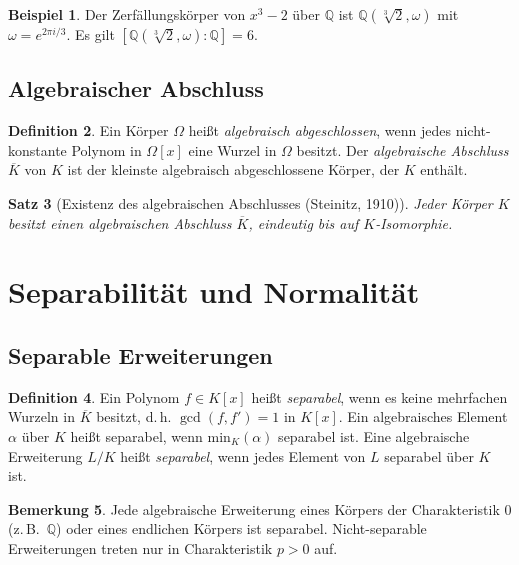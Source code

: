 \documentclass[12pt,a4paper]{amsart}
\newtheorem{theorem}{Satz}[section]
\theoremstyle{definition}
\newtheorem{definition}[theorem]{Definition}
\newtheorem{beispiel}[theorem]{Beispiel}
\newtheorem{bemerkung}[theorem]{Bemerkung}
\newcommand{\Q}{\mathbb{Q}}
\begin{document}
\begin{beispiel}
Der Zerfällungskörper von $x^3 - 2$ über $\Q$ ist
$\Q(\sqrt[3]{2}, \omega)$ mit $\omega = e^{2\pi i/3}$.
Es gilt $[\Q(\sqrt[3]{2},\omega):\Q] = 6$.
\end{beispiel}

\subsection{Algebraischer Abschluss}

\begin{definition}
Ein Körper $\Omega$ heißt \emph{algebraisch abgeschlossen}, wenn jedes
nicht-konstante Polynom in $\Omega[x]$ eine Wurzel in $\Omega$ besitzt.
Der \emph{algebraische Abschluss} $\overline{K}$ von $K$ ist der kleinste
algebraisch abgeschlossene Körper, der $K$ enthält.
\end{definition}

\begin{theorem}[Existenz des algebraischen Abschlusses (Steinitz, 1910)]
Jeder Körper $K$ besitzt einen algebraischen Abschluss $\overline{K}$,
eindeutig bis auf $K$-Isomorphie.
\end{theorem}

\section{Separabilität und Normalität}

\subsection{Separable Erweiterungen}

\begin{definition}
Ein Polynom $f \in K[x]$ heißt \emph{separabel}, wenn es keine mehrfachen
Wurzeln in $\overline{K}$ besitzt, d.\,h. $\gcd(f, f') = 1$ in $K[x]$.
Ein algebraisches Element $\alpha$ über $K$ heißt separabel, wenn
$\mathrm{min}_K(\alpha)$ separabel ist. Eine algebraische Erweiterung $L/K$
heißt \emph{separabel}, wenn jedes Element von $L$ separabel über $K$ ist.
\end{definition}

\begin{bemerkung}
Jede algebraische Erweiterung eines Körpers der Charakteristik $0$ (z.\,B.\ $\Q$)
oder eines endlichen Körpers ist separabel. Nicht-separable Erweiterungen treten
nur in Charakteristik $p > 0$ auf.
\end{bemerkung}
\end{document}
